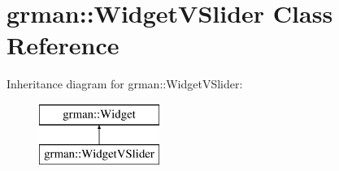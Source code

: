 \hypertarget{classgrman_1_1_widget_v_slider}{}\section{grman\+:\+:Widget\+V\+Slider Class Reference}
\label{classgrman_1_1_widget_v_slider}
Inheritance diagram for grman\+:\+:Widget\+V\+Slider\+:\begin{figure}[H]
\begin{center}
\leavevmode
\includegraphics[height=2.000000cm]{classgrman_1_1_widget_v_slider}
\end{center}
\end{figure}

